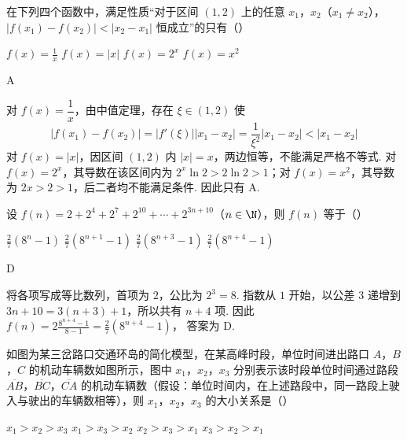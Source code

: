 \begin{problem}
在下列四个函数中，满足性质“对于区间 \((1,2)\) 上的任意 \(x_1\)，\(x_2\)（\(x_1\neq x_2\)），\(|f(x_1)-f(x_2)|<|x_2-x_1|\) 恒成立”的只有（\quad）

\choices
    {\(f(x)=\frac{1}{x}\)}
    {\(f(x)=|x|\)}
    {\(f(x)=2^x\)}
    {\(f(x)=x^2\)}
\end{problem}

\begin{answer}
A
\end{answer}

\begin{solution}
对 \(f(x)=\dfrac1x\)，由中值定理，存在 \(\xi\in(1,2)\) 使
\[
\left|f(x_1)-f(x_2)\right|=\left|f'(\xi)\right|\left|x_1-x_2\right|=\frac{1}{\xi^2}\left|x_1-x_2\right|<\left|x_1-x_2\right|
\]
对 \(f(x)=|x|\)，因区间 \((1,2)\) 内 \(|x|=x\)，两边恒等，不能满足严格不等式. 对 \(f(x)=2^x\)，其导数在该区间内为 \(2^x\ln2>2\ln2>1\)；对 \(f(x)=x^2\)，其导数为 \(2x>2>1\)，后二者均不能满足条件. 因此只有 A.
\end{solution}

\begin{problem}
设 \(f(n)=2+2^{4}+2^{7}+2^{10}+\cdots+2^{3n+10}\)（\(n\in\N\)），则 \(f(n)\) 等于（\quad）

\choices
    {\(\frac{2}{7}(8^n-1)\)}
    {\(\frac{2}{7}(8^{n+1}-1)\)}
    {\(\frac{2}{7}(8^{n+3}-1)\)}
    {\(\frac{2}{7}(8^{n+4}-1)\)}
\end{problem}

\begin{answer}
D
\end{answer}

\begin{solution}
将各项写成等比数列，首项为 \(2\)，公比为 \(2^3=8\). 指数从 \(1\) 开始，以公差 \(3\) 递增到 \(3n+10=3(n+3)+1\)，所以共有 \(n+4\) 项. 因此 \(f(n)=2\frac{8^{n+4}-1}{8-1}=\frac27\left(8^{n+4}-1\right)\)，
答案为 D.
\end{solution}

\begin{problem}
如图为某三岔路口交通环岛的简化模型，在某高峰时段，单位时间进出路口 \(A\)，\(B\)，\(C\) 的机动车辆数如图所示，图中 \(x_1\)，\(x_2\)，\(x_3\) 分别表示该时段单位时间通过路段 \(\overline{AB}\)，\(\overline{BC}\)，\(\overline{CA}\) 的机动车辆数（假设：单位时间内，在上述路段中，同一路段上驶入与驶出的车辆数相等），则 \(x_1\)，\(x_2\)，\(x_3\) 的大小关系是（\quad）


\choices
    {\(x_1>x_2>x_3\)}
    {\(x_1>x_3>x_2\)}
    {\(x_2>x_3>x_1\)}
    {\(x_3>x_2>x_1\)}
\end{problem}


